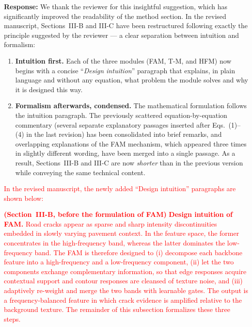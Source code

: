 \documentclass[lettersize,journal,onecolumn,12pt]{IEEEtran}
\begin{document}
\textbf{Response:}
We thank the reviewer for this insightful suggestion, which has significantly improved the readability of the method
section. In the revised manuscript, Sections~III-B and III-C have been restructured following exactly the principle
suggested by the reviewer --- a clear separation between intuition and formalism:

\begin{enumerate}
    \item \textbf{Intuition first.} Each of the three modules (FAM, T-M, and HFM) now begins with a concise
    ``\emph{Design intuition}'' paragraph that explains, in plain language and without any equation, what problem the
    module solves and why it is designed this way.

    \item \textbf{Formalism afterwards, condensed.} The mathematical formulation follows the intuition paragraph.
    The previously scattered equation-by-equation commentary (several separate explanatory passages inserted after
    Eqs.~(1)--(4) in the last revision) has been consolidated into brief remarks, and overlapping explanations of the
    FAM mechanism, which appeared three times in slightly different wording, have been merged into a single passage.
    As a result, Sections~III-B and III-C are now \emph{shorter} than in the previous version while conveying the
    same technical content.
\end{enumerate}

\textcolor{red}{In the revised manuscript, the newly added ``Design intuition'' paragraphs are shown below:}

\textcolor{red}{
\textbf{(Section~III-B, before the formulation of FAM)}
\textbf{Design intuition of FAM.} Road cracks appear as sparse and sharp intensity discontinuities embedded in slowly
varying pavement context. In the feature space, the former concentrates in the high-frequency band, whereas the
latter dominates the low-frequency band. The FAM is therefore designed to (i) decompose each backbone feature into a
high-frequency and a low-frequency component, (ii) let the two components exchange complementary information, so that
edge responses acquire contextual support and contour responses are cleansed of texture noise, and (iii) adaptively
re-weight and merge the two bands with learnable gates. The output is a frequency-balanced feature in which crack
evidence is amplified relative to the background texture. The remainder of this subsection formalizes these three
steps.
}
\end{document}
